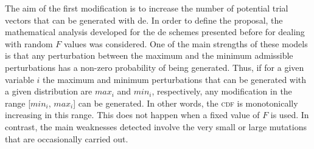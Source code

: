 \documentclass[review,3p]{elsarticle}
\newcommand{\DE}{{\sc de}}
\begin{document}
The aim of the first modification is to increase the number of potential trial vectors that can be generated
with \DE{}.
%
In order to define the proposal, the mathematical analysis developed for the \DE{}
schemes presented before for dealing with random $F$ values was considered.
%
One of the main strengths of these models is that any perturbation between the maximum and the minimum
admissible perturbations has a non-zero probability of being generated.
%
Thus, if for a given variable $i$ the maximum and minimum perturbations that can be generated with a given distribution
are $max_i$ and $min_i$, respectively, any modification in the range [$min_i$, $max_i$] can be generated.
%
In other words, the \textsc{cdf} is monotonically increasing in this range.
%
This does not happen when a fixed value of $F$ is used.
%
In contrast, the main weaknesses detected involve the very small or large mutations that
are occasionally carried out.
\end{document}
